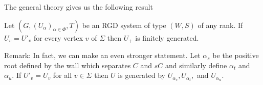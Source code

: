 \documentclass[class=book, crop=false,12 pt]{standalone}
\begin{document}
\vspace{1 in}
The general theory gives us the following result
\begin{theorem}
	\label{thm:knownfg}
	Let $(G,(U_\alpha)_{\alpha\in \Phi},T)$ be an RGD system of type $(W,S)$ of any rank. If $U_v=U'_v$ for every vertex $v$ of $\Sigma$ then $U_+$ is finitely generated.
\end{theorem}

Remark: In fact, we can make an even stronger statement. Let $\alpha_s$ be the positive root defined by the wall which separates $C$ and $sC$ and similarly define  $\alpha_t$ and $\alpha_u.$ If $U'_v=U_v$ for all $v\in \Sigma$ then $U$ is generated by $ U_{\alpha_s}, U_{\alpha_t},$ and  $U_{\alpha_u}.$

%
%
%
\end{document}
